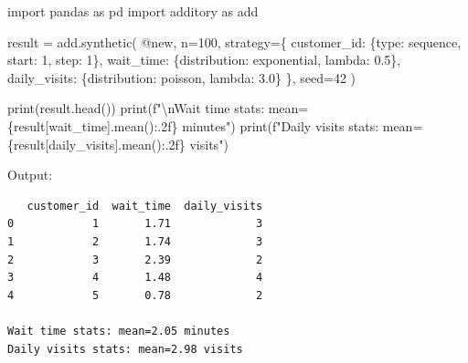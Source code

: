 \documentclass[
  letterpaper,
]{scrbook}
\newenvironment{Shaded}{\begin{snugshade}}{\end{snugshade}}
\newcommand{\BuiltInTok}[1]{\textcolor[rgb]{0.00,0.23,0.31}{#1}}
\newcommand{\CharTok}[1]{\textcolor[rgb]{0.13,0.47,0.30}{#1}}
\newcommand{\DecValTok}[1]{\textcolor[rgb]{0.68,0.00,0.00}{#1}}
\newcommand{\FloatTok}[1]{\textcolor[rgb]{0.68,0.00,0.00}{#1}}
\newcommand{\ImportTok}[1]{\textcolor[rgb]{0.00,0.46,0.62}{#1}}
\newcommand{\NormalTok}[1]{\textcolor[rgb]{0.00,0.23,0.31}{#1}}
\newcommand{\OperatorTok}[1]{\textcolor[rgb]{0.37,0.37,0.37}{#1}}
\newcommand{\SpecialCharTok}[1]{\textcolor[rgb]{0.37,0.37,0.37}{#1}}
\newcommand{\SpecialStringTok}[1]{\textcolor[rgb]{0.13,0.47,0.30}{#1}}
\newcommand{\StringTok}[1]{\textcolor[rgb]{0.13,0.47,0.30}{#1}}
\begin{document}
\begin{Shaded}
\begin{Highlighting}[]
\ImportTok{import}\NormalTok{ pandas }\ImportTok{as}\NormalTok{ pd}
\ImportTok{import}\NormalTok{ additory }\ImportTok{as}\NormalTok{ add}

\NormalTok{result }\OperatorTok{=}\NormalTok{ add.synthetic(}
    \StringTok{\textquotesingle{}@new\textquotesingle{}}\NormalTok{,}
\NormalTok{    n}\OperatorTok{=}\DecValTok{100}\NormalTok{,}
\NormalTok{    strategy}\OperatorTok{=}\NormalTok{\{}
        \StringTok{\textquotesingle{}customer\_id\textquotesingle{}}\NormalTok{: \{}\StringTok{\textquotesingle{}type\textquotesingle{}}\NormalTok{: }\StringTok{\textquotesingle{}sequence\textquotesingle{}}\NormalTok{, }\StringTok{\textquotesingle{}start\textquotesingle{}}\NormalTok{: }\DecValTok{1}\NormalTok{, }\StringTok{\textquotesingle{}step\textquotesingle{}}\NormalTok{: }\DecValTok{1}\NormalTok{\},}
        \StringTok{\textquotesingle{}wait\_time\textquotesingle{}}\NormalTok{: \{}\StringTok{\textquotesingle{}distribution\textquotesingle{}}\NormalTok{: }\StringTok{\textquotesingle{}exponential\textquotesingle{}}\NormalTok{, }\StringTok{\textquotesingle{}lambda\textquotesingle{}}\NormalTok{: }\FloatTok{0.5}\NormalTok{\},}
        \StringTok{\textquotesingle{}daily\_visits\textquotesingle{}}\NormalTok{: \{}\StringTok{\textquotesingle{}distribution\textquotesingle{}}\NormalTok{: }\StringTok{\textquotesingle{}poisson\textquotesingle{}}\NormalTok{, }\StringTok{\textquotesingle{}lambda\textquotesingle{}}\NormalTok{: }\FloatTok{3.0}\NormalTok{\}}
\NormalTok{    \},}
\NormalTok{    seed}\OperatorTok{=}\DecValTok{42}
\NormalTok{)}

\BuiltInTok{print}\NormalTok{(result.head())}
\BuiltInTok{print}\NormalTok{(}\SpecialStringTok{f"}\CharTok{\textbackslash{}n}\SpecialStringTok{Wait time stats: mean=}\SpecialCharTok{\{}\NormalTok{result[}\StringTok{\textquotesingle{}wait\_time\textquotesingle{}}\NormalTok{]}\SpecialCharTok{.}\NormalTok{mean()}\SpecialCharTok{:.2f\}}\SpecialStringTok{ minutes"}\NormalTok{)}
\BuiltInTok{print}\NormalTok{(}\SpecialStringTok{f"Daily visits stats: mean=}\SpecialCharTok{\{}\NormalTok{result[}\StringTok{\textquotesingle{}daily\_visits\textquotesingle{}}\NormalTok{]}\SpecialCharTok{.}\NormalTok{mean()}\SpecialCharTok{:.2f\}}\SpecialStringTok{ visits"}\NormalTok{)}
\end{Highlighting}
\end{Shaded}

Output:

\begin{verbatim}
   customer_id  wait_time  daily_visits
0            1       1.71             3
1            2       1.74             3
2            3       2.39             2
3            4       1.48             4
4            5       0.78             2

Wait time stats: mean=2.05 minutes
Daily visits stats: mean=2.98 visits
\end{verbatim}
\end{document}
